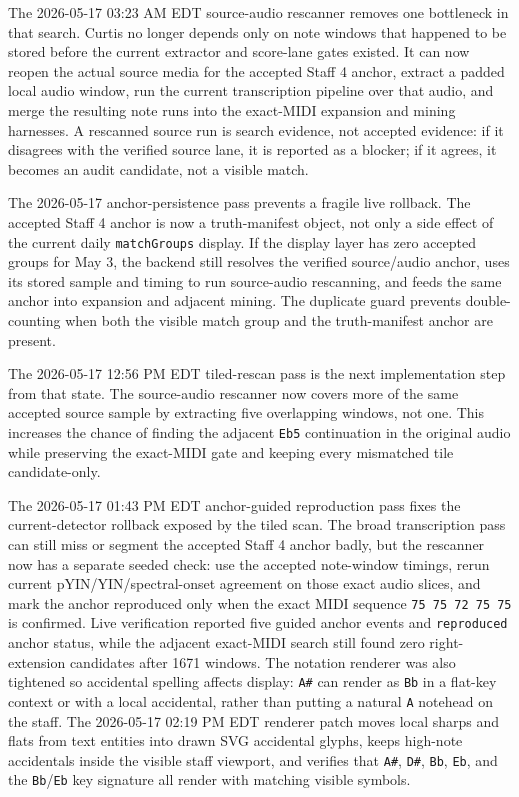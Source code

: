 The 2026-05-17 03:23 AM EDT source-audio rescanner removes one bottleneck in that search. Curtis no longer depends only on note windows that happened to be stored before the current extractor and score-lane gates existed. It can now reopen the actual source media for the accepted Staff 4 anchor, extract a padded local audio window, run the current transcription pipeline over that audio, and merge the resulting note runs into the exact-MIDI expansion and mining harnesses. A rescanned source run is search evidence, not accepted evidence: if it disagrees with the verified source lane, it is reported as a blocker; if it agrees, it becomes an audit candidate, not a visible match.

The 2026-05-17 anchor-persistence pass prevents a fragile live rollback. The accepted Staff 4 anchor is now a truth-manifest object, not only a side effect of the current daily \texttt{matchGroups} display. If the display layer has zero accepted groups for May 3, the backend still resolves the verified source/audio anchor, uses its stored sample and timing to run source-audio rescanning, and feeds the same anchor into expansion and adjacent mining. The duplicate guard prevents double-counting when both the visible match group and the truth-manifest anchor are present.

The 2026-05-17 12:56 PM EDT tiled-rescan pass is the next implementation step from that state. The source-audio rescanner now covers more of the same accepted source sample by extracting five overlapping windows, not one. This increases the chance of finding the adjacent \texttt{Eb5} continuation in the original audio while preserving the exact-MIDI gate and keeping every mismatched tile candidate-only.

The 2026-05-17 01:43 PM EDT anchor-guided reproduction pass fixes the current-detector rollback exposed by the tiled scan. The broad transcription pass can still miss or segment the accepted Staff 4 anchor badly, but the rescanner now has a separate seeded check: use the accepted note-window timings, rerun current pYIN/YIN/spectral-onset agreement on those exact audio slices, and mark the anchor reproduced only when the exact MIDI sequence \texttt{75 75 72 75 75} is confirmed. Live verification reported five guided anchor events and \texttt{reproduced} anchor status, while the adjacent exact-MIDI search still found zero right-extension candidates after 1671 windows. The notation renderer was also tightened so accidental spelling affects display: \texttt{A\#} can render as \texttt{Bb} in a flat-key context or with a local accidental, rather than putting a natural \texttt{A} notehead on the staff. The 2026-05-17 02:19 PM EDT renderer patch moves local sharps and flats from text entities into drawn SVG accidental glyphs, keeps high-note accidentals inside the visible staff viewport, and verifies that \texttt{A\#}, \texttt{D\#}, \texttt{Bb}, \texttt{Eb}, and the \texttt{Bb}/\texttt{Eb} key signature all render with matching visible symbols.

